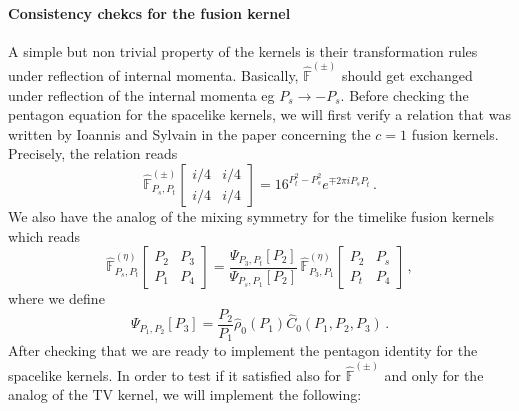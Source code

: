 \documentclass[11pt]{article}
\begin{document}
\paragraph{Consistency chekcs for the fusion kernel}

A simple but non trivial property of the kernels is their transformation rules under reflection of internal momenta. Basically, $\hat{\mathbb{F}}^{(\pm)}$ should get exchanged under reflection of the internal momenta eg $P_s\rightarrow-P_s$. Before checking the pentagon equation for the spacelike kernels, we will first verify a relation that was written by Ioannis and Sylvain in the paper concerning the $c=1$ fusion kernels. Precisely, the relation reads
\begin{equation}\label{eq:RibaultTsiaresc=1}
    \hat{\mathbb{F}}^{(\pm)}_{P_s,P_t}\begin{bmatrix}
     i/4 & i/4 \\
     i/4 & i/4
    \end{bmatrix}=16^{P_t^2-P_s^2}e^{\mp 2\pi i P_s P_t}\,.
\end{equation}
We also have the analog of the mixing symmetry for the timelike fusion kernels which reads
\begin{equation}
    \hat{\mathbb{F}}_{P_s,P_t}^{(\eta)}\begin{bmatrix}
     P_2 & P_3 \\
     P_1 & P_4
    \end{bmatrix}=\frac{\Psi_{P_3, P_t}[P_2]}{\Psi_{P_s, P_1}[P_2]}\,\hat{\mathbb{F}}_{P_3,P_1}^{(\eta)}\begin{bmatrix}
     P_2 & P_s \\
     P_t & P_4
    \end{bmatrix}\,,
\end{equation}
where we define 
\begin{equation}
    \Psi_{P_1, P_2}[P_3]=\frac{P_2}{P_1}\hat{\rho}_0(P_1)\hat{C}_0(P_1, P_2, P_3)\,.
\end{equation}
After checking that we are ready to implement the pentagon identity for the spacelike kernels. In order to test if it satisfied also for $\hat{\mathbb{F}}^{(\pm)}$ and only for the analog of the TV kernel, we will implement the following:
\end{document}
